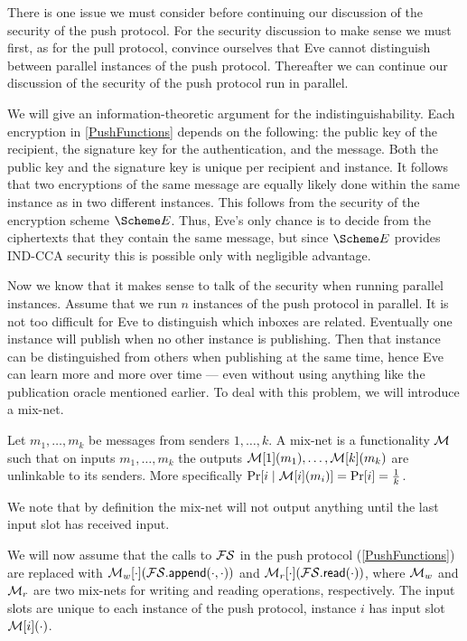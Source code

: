 There is one issue we must consider before continuing our discussion of the 
security of the push protocol.
For the security discussion to make sense we must first, as for the pull 
protocol, convince ourselves that Eve cannot distinguish between parallel 
instances of the push protocol.
Thereafter we can continue our discussion of the security of the push protocol 
run in parallel.

We will give an information-theoretic argument for the indistinguishability.
Each encryption in \cref{PushFunctions} depends on the following:
the public key of the recipient, the signature key for the authentication, 
and the message.
Both the public key and the signature key is unique per recipient and instance.
It follows that two encryptions of the same message are equally likely done 
within the same instance as in two different instances.
This follows from the security of the encryption scheme \(\E\).
Thus, Eve's only chance is to decide from the ciphertexts that they contain the 
same message, but since \(\E\) provides IND-CCA security this is possible only 
with negligible advantage.

Now we know that it makes sense to talk of the security when running parallel 
instances.
Assume that we run \(n\) instances of the push protocol in parallel.
It is not too difficult for Eve to distinguish which inboxes are related.
Eventually one instance will publish when no other instance is publishing.
Then that instance can be distinguished from others when publishing at the same
time, hence Eve can learn more and more over time --- even without using 
anything like the publication oracle mentioned earlier.
To deal with this problem, we will introduce a mix-net.

\begin{definition}\label{MixNet}
  Let \(m_1, \ldots, m_k\) be messages from senders \(1, \ldots, k\).
  A mix-net is a functionality \(\operatorname{\mathcal{M}}\) such that on inputs \(m_1, \ldots, m_k\) 
  the outputs \(\operatorname{\mathcal{M}}[1](m_1), \ldots, \operatorname{\mathcal{M}}[k](m_k)\) are unlinkable to its senders.
  More specifically \(\Pr[i\mid \operatorname{\mathcal{M}}[i](m_i)] = \Pr[i] = \frac{1}{k}\).
\end{definition}

We note that by definition the mix-net will not output anything until the last
input slot has received input.

We will now assume that the calls to \(\FS\) in the push protocol 
(\cref{PushFunctions}) are replaced with 
\(\M_w[\cdot](\fswrite[\cdot][\cdot])\) and \(\M_r[\cdot](\fsread[\cdot])\), 
where \(\operatorname{\mathcal{M}}_w\) and \(\operatorname{\mathcal{M}}_r\) are two mix-nets for writing and reading 
operations, respectively.
The input slots are unique to each instance of the push protocol, instance 
\(i\) has input slot \(\operatorname{\mathcal{M}}[i](\cdot)\).


